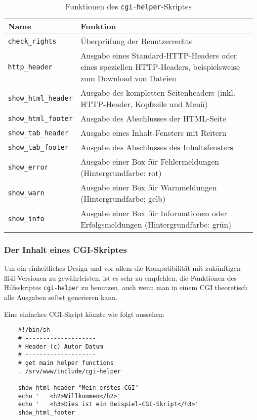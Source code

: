 \begin{table}[htbp]
  \centering
  \caption{Funktionen des \texttt{cgi-helper}-Skriptes}
  \label{tab:dev:cgi-helper}
  \begin{small}
    \begin{tabular}{|l|p{}|}
      \hline
      Name                         & Funktion         \\
      \hline
      \texttt{check\_rights}      & Überprüfung der Benutzerrechte \\
      \texttt{http\_header}       & Ausgabe eines Standard-HTTP-Headers oder eines speziellen HTTP-Headers, beispielsweise zum Download von Dateien\\
      \texttt{show\_html\_header} & Ausgabe des kompletten Seitenheaders (inkl. HTTP-Header, Kopfzeile und Menü)\\
      \texttt{show\_html\_footer} & Ausgabe des Abschlusses der HTML-Seite \\
      \texttt{show\_tab\_header}  & Ausgabe eines Inhalt-Fensters mit Reitern\\
      \texttt{show\_tab\_footer}  & Ausgabe des Abschlusses des Inhaltsfensters\\
      \texttt{show\_error}        & Ausgabe einer Box für Fehlermeldungen (Hintergrundfarbe: rot)\\
      \texttt{show\_warn}         & Ausgabe einer Box für Warnmeldungen (Hintergrundfarbe: gelb)\\
      \texttt{show\_info}         & Ausgabe einer Box für Informationen oder Erfolgsmeldungen (Hintergrundfarbe: grün)\\
      \hline
    \end{tabular}
  \end{small}
\end{table}

\subsubsection{Der Inhalt eines CGI-Skriptes}

Um ein einheitliches Design und vor allem die Kompatibilität
mit zukünftigen fli4l-Versionen zu gewährleisten, ist es sehr zu empfehlen, die
Funktionen des Hilfsskriptes \texttt{cgi-helper} zu benutzen, auch wenn man in
einem CGI theoretisch alle Ausgaben selbst generieren kann.

Eine einfaches CGI-Skript könnte wie folgt aussehen:

\begin{example}
\begin{verbatim}
    #!/bin/sh
    # --------------------
    # Header (c) Autor Datum
    # --------------------
    # get main helper functions
    . /srv/www/include/cgi-helper

    show_html_header "Mein erstes CGI"
    echo '   <h2>Willkommen</h2>'
    echo '   <h3>Dies ist ein Beispiel-CGI-Skript</h3>'
    show_html_footer
\end{verbatim}
\end{example}

